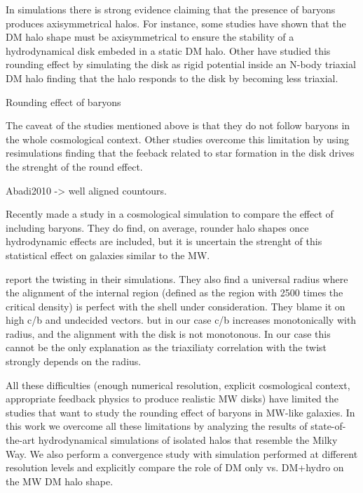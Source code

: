 \documentclass[a4paper,fleqn,usenatbib]{mnras}
\begin{document}
In simulations there is strong evidence claiming that the presence of
baryons produces axisymmetrical halos.  
For instance, some studies have shown that the DM halo shape must be
axisymmetrical to ensure the stability of a hydrodynamical disk
embeded in a static DM halo. 
Other have studied this rounding effect by simulating the disk as rigid
potential inside an N-body triaxial DM
halo \cite{Debattista_et_al._2008,Debattista_et_al._2013,Kazantzidis_et_al._2010}
finding that the halo responds to the disk by becoming less triaxial. 

Rounding effect of baryons
\citep{Dubinski94}

The caveat of the studies mentioned above is that they do not
follow baryons in the whole cosmological context. 
Other studies overcome this limitation by using resimulations 
\citep{Abadi_et_al._2010,Bryan_et_al._2013} finding that the
feeback related to star formation in the disk drives the strenght of
the round effect. 

Abadi2010 -> well aligned countours.

Recently \cite{2018arXiv180907255C} made a study in a cosmological
simulation to compare the effect of including baryons. They do find,
on average, rounder halo shapes once hydrodynamic effects are
included, but it is uncertain the strenght of this statistical effect
on galaxies similar to the MW.


\citep{JingSuto02} report the twisting in their simulations.
They also find a universal radius where the alignment of the internal 
region (defined as the region with 2500 times the critical density) 
is perfect with the shell under consideration.
They blame it on high c/b and undecided vectors.
but in our case c/b increases monotonically with radius, and the
alignment with the disk is not monotonous. In our case this cannot be
the only explanation as the triaxiliaty correlation with the twist 
strongly depends on the radius.

\citep{Pedrosa10}


All these difficulties (enough numerical resolution, explicit
cosmological context, appropriate feedback physics to produce
realistic MW disks) have limited the studies that want to study the
rounding effect of baryons in MW-like galaxies.
In this work we overcome all these limitations by analyzing the
results of state-of-the-art hydrodynamical simulations of isolated
halos that resemble the Milky Way.
We also perform a convergence study with simulation performed at
different resolution levels and explicitly compare the role of DM only
vs. DM+hydro on the MW DM halo shape.
\end{document}
